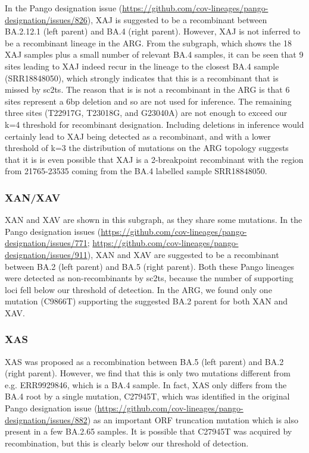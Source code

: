 \documentclass[12pt]{article}
\begin{document}
In the Pango designation issue
(\url{https://github.com/cov-lineages/pango-designation/issues/826}),
XAJ is suggested to be a recombinant between
BA.2.12.1 (left parent) and BA.4 (right parent).
However, XAJ is not inferred to be a recombinant lineage in the ARG.
From the subgraph, which shows the 18 XAJ samples
plus a small number of relevant BA.4 samples,
it can be seen that 9 sites leading to XAJ indeed recur
in the lineage to the closest BA.4 sample (SRR18848050),
which strongly indicates that this is a recombinant
that is missed by sc2ts.
The reason that is is not a recombinant in the ARG is
that 6 sites represent a 6bp deletion and so are not used for inference.
The remaining three sites (T22917G, T23018G, and G23040A)
are not enough to exceed our k=4 threshold  for recombinant designation.
Including deletions in inference would certainly
lead to XAJ being detected as a recombinant,
and with a lower threshold of k=3
the distribution of mutations on the ARG topology suggests
that it is is even possible that XAJ is a 2-breakpoint recombinant
with the region from 21765-23535
coming from the BA.4 labelled sample SRR18848050.


\subsubsection{XAN/XAV}
\label{sec:dd_xan}


XAN and XAV are shown in this subgraph, as they share some mutations.
In the Pango designation issues
(\url{https://github.com/cov-lineages/pango-designation/issues/771};
\url{https://github.com/cov-lineages/pango-designation/issues/911}),
XAN and XAV are suggested to be a recombinant between
BA.2 (left parent) and BA.5 (right parent).
Both these Pango lineages were detected as non-recombinants by sc2ts,
because the number of supporting loci fell below our threshold of detection.
In the ARG, we found only one mutation (C9866T)
supporting the suggested BA.2 parent for both XAN and XAV.



\subsubsection{XAS}
\label{sec:dd_xas}

XAS was proposed as a recombination between
BA.5 (left parent) and BA.2 (right parent).
However, we find that this is only two mutations
different from e.g. ERR9929846, which is a BA.4 sample.
In fact, XAS only differs from the BA.4 root by a single mutation,
C27945T, which was identified in the original Pango designation issue
(\url{https://github.com/cov-lineages/pango-designation/issues/882})
as an important ORF truncation mutation
which is also present in a few BA.2.65 samples.
It is possible that C27945T was acquired by recombination,
but this is clearly below our threshold of detection.
\end{document}

